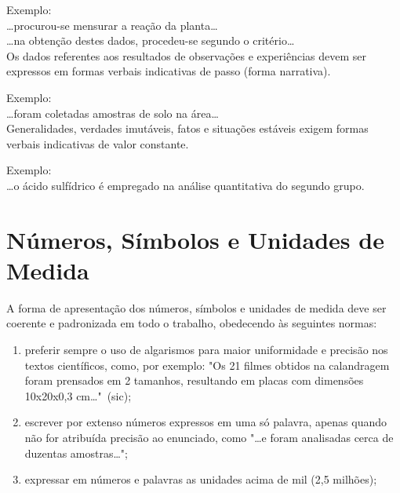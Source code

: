 \documentclass[repeatfields,xlists,xpacks,oneside,yearsonly]{ufrgscca}
\begin{document}
\begin{annex}
        Exemplo:\\

        \ldots procurou-se mensurar a reação da planta\ldots\\

        \ldots na obtenção destes dados, procedeu-se segundo o critério\ldots\\

        Os dados  referentes aos resultados de observações e experiências devem ser
        expressos em formas verbais indicativas de passo (forma narrativa).

        Exemplo:\\

        \ldots foram coletadas amostras de solo na área\ldots\\

        Generalidades, verdades imutáveis, fatos e situações estáveis exigem formas
        verbais indicativas de valor constante.

        Exemplo:\\

        \ldots o ácido sulfídrico é empregado na análise quantitativa do segundo grupo.\\

        \section{Números, Símbolos e Unidades de Medida}

        A forma de apresentação dos números, símbolos e unidades de medida deve ser
        coerente e padronizada em todo o trabalho, obedecendo às seguintes normas:

        \begin{enumerate}

            \item preferir sempre o uso de algarismos para maior uniformidade e precisão
            nos textos científicos, como, por exemplo: "Os 21 filmes obtidos na
            calandragem foram prensados em 2 tamanhos, resultando em placas com
            dimensões 10x20x0,3 cm\ldots"\ (sic);

            \item escrever por extenso números expressos em uma só palavra, apenas
            quando não for atribuída precisão ao enunciado, como "\ldots e foram analisadas
            cerca de duzentas amostras\ldots";

            \item expressar em números e palavras as unidades acima de mil (2,5
            milhões);


\end{enumerate}
\end{annex}
\end{document}
